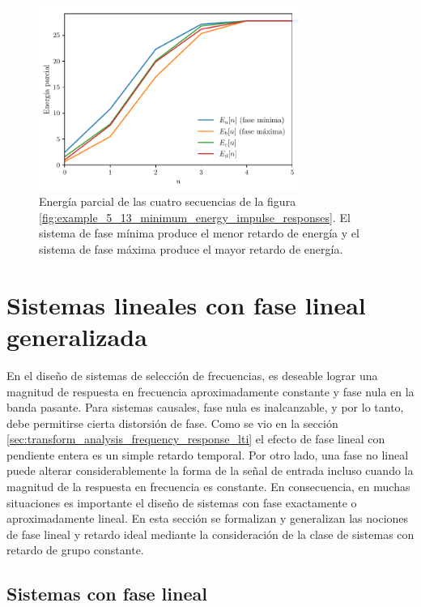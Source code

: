 \documentclass[a4paper]{report}
\begin{document}
\begin{figure}[!htb]
 \begin{center}
 \includegraphics[width=0.76\textwidth]{figuras/example_5_13_minimum_energy_partial_energy.pdf}
 \caption{\label{fig:example_5_13_minimum_energy_partial_energy} Energía parcial de  las  cuatro secuencias de la figura \ref{fig:example_5_13_minimum_energy_impulse_responses}. El sistema de fase mínima produce el menor retardo de energía y el sistema de fase máxima produce el mayor retardo de energía.}
 \end{center}
\end{figure}

\section{Sistemas lineales con fase lineal generalizada}

En el diseño de sistemas de selección de frecuencias, es deseable lograr una magnitud de respuesta en frecuencia aproximadamente constante y fase nula en la banda pasante. Para sistemas causales, fase nula es inalcanzable, y por lo tanto, debe permitirse cierta distorsión de fase. Como se vio en la sección \ref{sec:transform_analysis_frequency_response_lti} el efecto de fase lineal con pendiente entera es un simple retardo temporal. Por otro lado, una fase no lineal puede alterar considerablemente la forma de la señal de entrada incluso cuando la magnitud de la respuesta en frecuencia es constante. En consecuencia, en muchas situaciones es importante el diseño de sistemas con fase exactamente o aproximadamente lineal. En esta sección se formalizan y generalizan las nociones de fase lineal y retardo ideal mediante la consideración de la clase de sistemas con retardo de grupo constante.

\subsection{Sistemas con fase lineal}\label{sec:transform_analysis_lineal_phase_systems}
\end{document}
